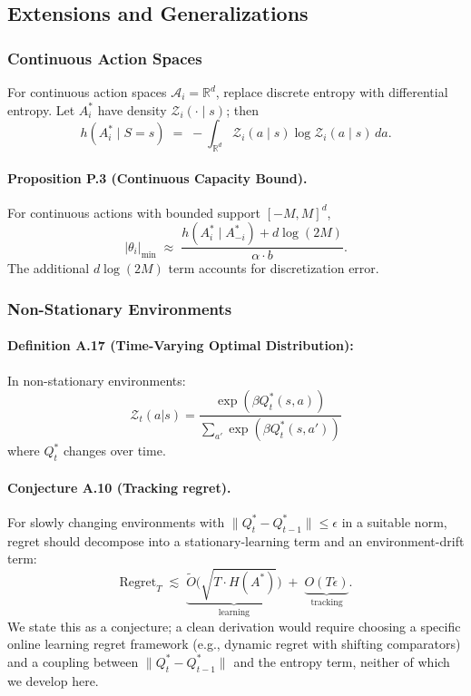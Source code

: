 \documentclass[10pt, letterpaper]{article}
\begin{document}
\subsection{Extensions and Generalizations}

\subsubsection{Continuous Action Spaces}

For continuous action spaces $\mathcal{A}_i = \mathbb{R}^d$, replace discrete entropy with differential entropy. Let $A_i^*$ have density $\mathcal{Z}_i(\cdot \mid s)$; then
\[h(A_i^* \mid S=s) \;=\; -\int_{\mathbb{R}^d} \mathcal{Z}_i(a \mid s) \log \mathcal{Z}_i(a \mid s)\, da.\]

\paragraph{Proposition P.3 (Continuous Capacity Bound).} For continuous actions with bounded support $[-M, M]^d$,
\[|\theta_i|_{\min} \;\approx\; \frac{h(A_i^* \mid A_{-i}^*) + d\log(2M)}{\alpha \cdot b}.\]
The additional $d\log(2M)$ term accounts for discretization error.

\subsubsection{Non-Stationary Environments}

\paragraph{Definition A.17 (Time-Varying Optimal Distribution):} In non-stationary environments:
\[\mathcal{Z}_t(a|s) = \frac{\exp(\beta Q^*_t(s,a))}{\sum_{a'} \exp(\beta Q^*_t(s,a'))}\]
where $Q^*_t$ changes over time.

\paragraph{Conjecture A.10 (Tracking regret).} For slowly changing environments with $\|Q^*_t - Q^*_{t-1}\| \leq \epsilon$ in a suitable norm, regret should decompose into a stationary-learning term and an environment-drift term:
\[\text{Regret}_T \;\lesssim\; \underbrace{\widetilde{O}\bigl(\sqrt{T \cdot H(A^*)}\bigr)}_\text{learning} \;+\; \underbrace{O(T\epsilon)}_\text{tracking}.\]
We state this as a conjecture; a clean derivation would require choosing a specific online learning regret framework (e.g., dynamic regret with shifting comparators) and a coupling between $\|Q^*_t - Q^*_{t-1}\|$ and the entropy term, neither of which we develop here.
\end{document}
